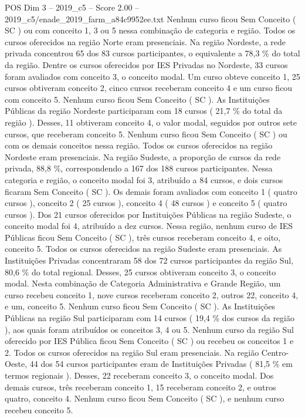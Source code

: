 \begin{textsample}{POS Dim 3 – 2019\_c5 – Score 2.00 – 2019\_c5/enade\_2019\_farm\_a84c9952ee.txt}
Nenhum curso ficou Sem Conceito ( SC ) ou com conceito 1, 3 ou 5 nessa combinação de categoria e região.
Todos os cursos oferecidos na região Norte eram presenciais.
Na região Nordeste, a rede privada concentrou 65 dos 83 cursos participantes, o equivalente a 78,3 \% do total da região.
Dentre os cursos oferecidos por IES Privadas no Nordeste, 33 cursos foram avaliados com conceito 3, o conceito modal.
Um curso obteve conceito 1, 25 cursos obtiveram conceito 2, cinco cursos receberam conceito 4 e um curso ficou com conceito 5.
Nenhum curso ficou Sem Conceito ( SC ).
As Instituições Públicas da região Nordeste participaram com 18 cursos ( 21,7 \% do total da região ).
Desses, 11 obtiveram conceito 4, o valor modal, seguidos por outros sete cursos, que receberam conceito 5.
Nenhum curso ficou Sem Conceito ( SC ) ou com os demais conceitos nessa região.
Todos os cursos oferecidos na região Nordeste eram presenciais.
Na região Sudeste, a proporção de cursos da rede privada, 88,8 \%, correspondendo a 167 dos 188 cursos participantes.
Nessa categoria e região, o conceito modal foi 3, atribuído a 84 cursos, e dois cursos ficaram Sem Conceito ( SC ).
Os demais foram avaliados com conceito 1 ( quatro cursos ), conceito 2 ( 25 cursos ), conceito 4 ( 48 cursos ) e conceito 5 ( quatro cursos ).
Dos 21 cursos oferecidos por Instituições Públicas na região Sudeste, o conceito modal foi 4, atribuído a dez cursos.
Nessa região, nenhum curso de IES Públicas ficou Sem Conceito ( SC ), três cursos receberam conceito 4, e oito, conceito 5.
Todos os cursos oferecidos na região Sudeste eram presenciais.
As Instituições Privadas concentraram 58 dos 72 cursos participantes da região Sul, 80,6 \% do total regional.
Desses, 25 cursos obtiveram conceito 3, o conceito modal.
Nesta combinação de Categoria Administrativa e Grande Região, um curso recebeu conceito 1, nove cursos receberam conceito 2, outros 22, conceito 4, e um, conceito 5.
Nenhum curso ficou Sem Conceito ( SC ).
As Instituições Públicas na região Sul participaram com 14 cursos ( 19,4 \% dos cursos da região ), aos quais foram atribuídos os conceitos 3, 4 ou 5.
Nenhum curso da região Sul oferecido por IES Pública ficou Sem Conceito ( SC ) ou recebeu os conceitos 1 e 2.
Todos os cursos oferecidos na região Sul eram presenciais.
Na região Centro-Oeste, 44 dos 54 cursos participantes eram de Instituições Privadas ( 81,5 \% em termos regionais ).
Desses, 22 receberam conceito 3, o conceito modal.
Dos demais cursos, três receberam conceito 1, 15 receberam conceito 2, e outros quatro, conceito 4.
Nenhum curso ficou Sem Conceito ( SC ), e nenhum curso recebeu conceito 5.

\end{textsample}
